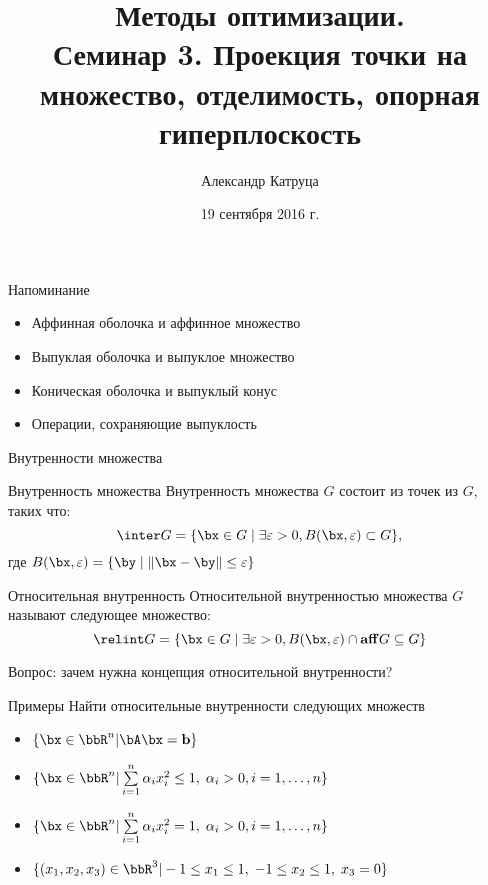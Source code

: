 \documentclass[12pt]{beamer}
\title[Семинар 3]{Методы оптимизации. \\
 Семинар 3. Проекция точки на множество, отделимость, опорная гиперплоскость}
\author{Александр Катруца}
\institute{Московский физико-технический институт,\\
Факультет Управления и Прикладной Математики}
\date{19 сентября 2016 г.}
\begin{document}
\begin{frame}
\maketitle
\end{frame}

\begin{frame}{Напоминание}
\begin{itemize}
\item Аффинная оболочка и аффинное множество
\item Выпуклая оболочка и выпуклое множество
\item Коническая оболочка и выпуклый конус
\item Операции, сохраняющие выпуклость
\end{itemize}
\end{frame}

\begin{frame}{Внутренности множества}

\begin{block}{Внутренность множества}
Внутренность множества $G$ состоит из точек из $G$, таких что:
\[ 
\inter G = \{ \bx \in G \; | \; \exists \varepsilon > 0, B(\bx, \varepsilon) \subset G\},
\]
где $B(\bx, \varepsilon) = \{ \by \; | \; \| \bx - \by \| \leq \varepsilon \}$
\end{block}

\begin{block}{Относительная внутренность}
Относительной внутренностью множества $G$ называют следующее множество: 
\[
\relint G = \{ \bx \in G \; | \; \exists \varepsilon > 0,  B(\bx, \varepsilon) \cap \mathbf{aff} G \subseteq G \}
\]
\end{block}
Вопрос: зачем нужна концепция относительной внутренности?
\end{frame}

\begin{frame}{Примеры}
Найти относительные внутренности следующих множеств
\begin{itemize}
\item $\{ \bx \in \bbR^n | \bA\bx = \mathbf{b} \}$
\item $\{ \bx \in \bbR^n | \sum\limits_{i=1}^n \alpha_i x_i^2 \leq 1, \; \alpha_i > 0 , i = 1,\ldots, n \}$ 
\item $\{ \bx \in \bbR^n | \sum\limits_{i=1}^n \alpha_i x_i^2 = 1, \; \alpha_i > 0 , i = 1,\ldots, n \}$ 
\item $\{ (x_1, x_2, x_3) \in \bbR^3 | -1 \leq x_1 \leq 1, \; -1 \leq x_2 \leq 1, \; x_3 = 0 \}$
\end{itemize}
\end{frame}
\end{document}
